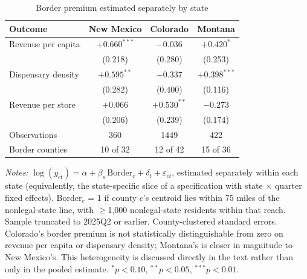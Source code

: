 \begin{table}[htbp]
\centering
\caption{Border premium estimated separately by state}
\label{tab:state_specific}
\footnotesize
\begin{tabular}{lccc}
\toprule
Outcome & New Mexico & Colorado & Montana \\
\midrule
Revenue per capita & $+0.660^{***}$ & $-0.036$ & $+0.420^{*}$ \\
 & (0.218) & (0.280) & (0.253) \\
Dispensary density & $+0.595^{**}$ & $-0.337$ & $+0.398^{***}$ \\
 & (0.282) & (0.400) & (0.116) \\
Revenue per store & $+0.066$ & $+0.530^{**}$ & $-0.273$ \\
 & (0.206) & (0.239) & (0.174) \\
\midrule
Observations & 360 & 1449 & 422 \\
Border counties & 10 of 32 & 12 of 42 & 15 of 36 \\
\bottomrule
\end{tabular}
\begin{minipage}{0.98\textwidth}
\vspace{0.3em}
\footnotesize
\textit{Notes:} $\log(y_{ct}) = \alpha + \beta_s\,\text{Border}_c + \delta_t + \varepsilon_{ct}$, estimated
separately within each state (equivalently, the state-specific slice of a specification with state $\times$
quarter fixed effects). Border$_c$ = 1 if county $c$'s centroid lies within 75 miles of the nonlegal-state
line, with $\geq$1,000 nonlegal-state residents within that reach. Sample truncated to 2025Q2 or earlier.
County-clustered standard errors. Colorado's border premium is not statistically distinguishable from zero on
revenue per capita or dispensary density; Montana's is closer in magnitude to New Mexico's. This heterogeneity
is discussed directly in the text rather than only in the pooled estimate. $^{*}p<0.10$, $^{**}p<0.05$,
$^{***}p<0.01$.
\end{minipage}
\end{table}
